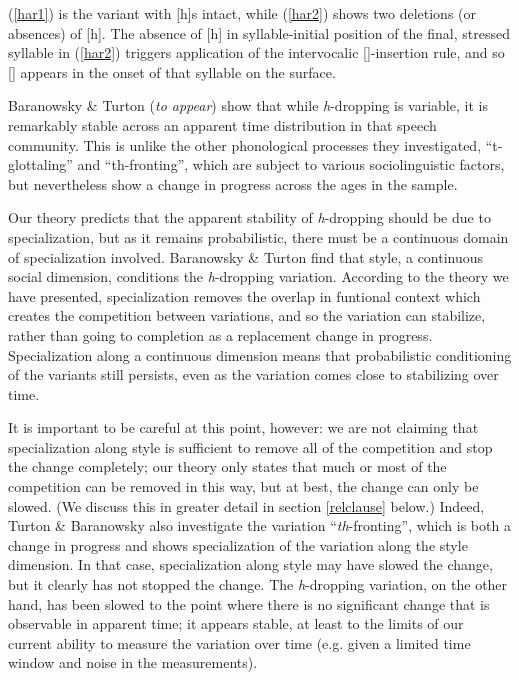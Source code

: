 \noindent (\ref{har1}) is the variant with [h]s intact, while (\ref{har2}) shows two deletions (or absences) of [h].
The absence of [h] in syllable-initial position of the final, stressed syllable in (\ref{har2}) triggers application of the intervocalic []-insertion rule, and so [] appears in the onset of that syllable on the surface.
	
Baranowsky \& Turton (\textsl{to appear}) show that while \textsl{h}-dropping is variable, it is remarkably stable across an apparent time distribution in that speech community.
This is unlike the other phonological processes they investigated, ``t-glottaling'' and ``th-fronting'', which are subject to various sociolinguistic factors, but nevertheless show a change in progress across the ages in the sample.

Our theory predicts that the apparent stability of \textsl{h}-dropping should be due to specialization, but as it remains probabilistic, there must be a continuous domain of specialization involved. Baranowsky \& Turton find that style, a continuous social dimension, conditions the \textsl{h}-dropping variation.
According to the theory we have presented, specialization removes the overlap in funtional context which creates the competition between variations, and so the variation can stabilize, rather than going to completion as a replacement change in progress.
Specialization along a continuous dimension means that probabilistic conditioning of the variants still persists, even as the variation comes close to stabilizing over time.

It is important to be careful at this point, however: we are not claiming that specialization along style is sufficient to remove all of the competition and stop the change completely; our theory only states that much or most of the competition can be removed in this way, but at best, the change can only be slowed.
(We discuss this in greater detail in section \ref{relclause} below.)
Indeed, Turton \& Baranowsky also investigate the variation ``\textsl{th}-fronting'', which is both a change in progress and shows specialization of the variation along the style dimension.
In that case, specialization along style may have slowed the change, but it clearly has not stopped the change.
The \textsl{h}-dropping variation, on the other hand, has been slowed to the point where there is no significant change that is observable in apparent time; it appears stable, at least to the limits of our current ability to measure the variation over time (e.g. given a limited time window and noise in the measurements).

